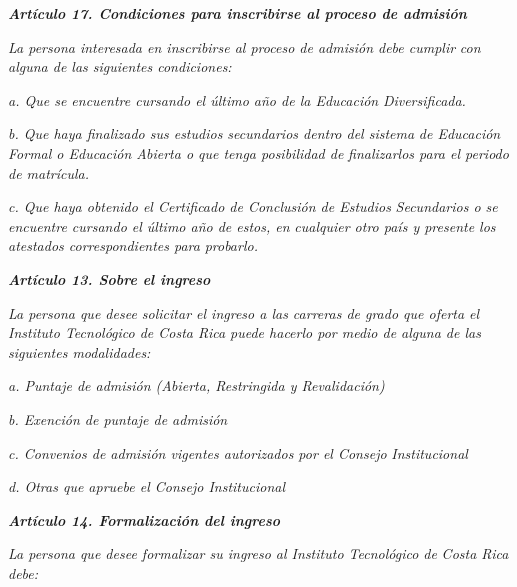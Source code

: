 \textit{\textbf{Artículo 17. Condiciones para inscribirse al proceso de admisión}}\par

\textit{La persona interesada en inscribirse al proceso de admisión debe cumplir}\textit{ }\textit{con alguna de las siguientes condiciones:}\textit{ }\par

\textit{a. Que se encuentre cursando el último año de la Educación}\textit{ }\textit{Diversificada.}\par

\textit{b. Que haya finalizado sus estudios secundarios dentro del sistema}\textit{ }\textit{de Educación Formal o Educación Abierta o que tenga posibilidad de}\textit{ }\textit{finalizarlos para el periodo de matrícula.}\textit{ }\par

\textit{c. Que haya obtenido el Certificado de Conclusión de Estudios}\textit{ }\textit{Secundarios o se encuentre cursando el último año de estos, en}\textit{ }\textit{cualquier otro país y presente los atestados correspondientes para}\textit{ }\textit{probarlo.}\par

\textit{\textbf{Artículo 13. Sobre el ingreso}}\par

\textit{La persona que desee solicitar el ingreso a las carreras de grado que oferta el Instituto Tecnológico de Costa Rica puede hacerlo por medio de alguna de las siguientes modalidades:}\par

\textit{a. Puntaje de admisión (Abierta, Restringida y Revalidación)}\par

\textit{b. Exención de puntaje de admisión}\par

\textit{c. Convenios de admisión vigentes autorizados por el Consejo}\textit{ }\textit{Institucional}\par

\textit{d. Otras que apruebe el Consejo Institucional}\par

\textit{\textbf{Artículo 14. Formalización del ingreso}}\par

\textit{La persona que desee formalizar su ingreso al Instituto Tecnológico de}\textit{ }\textit{Costa Rica debe:}\par

